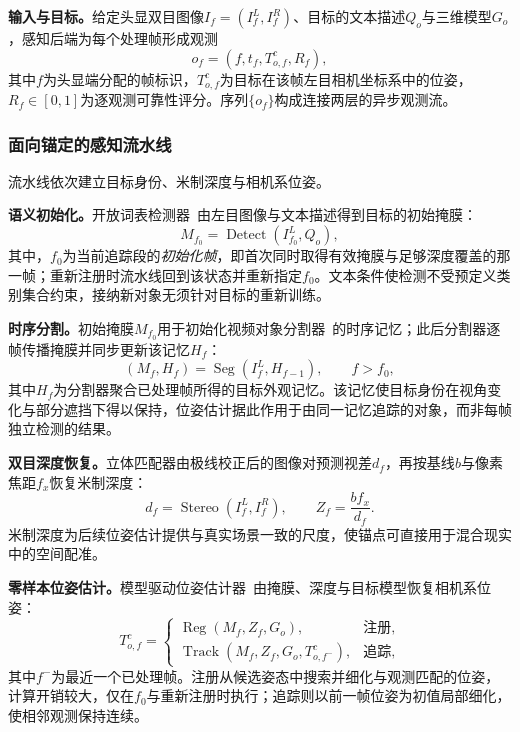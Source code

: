 \documentclass[review]{vgtc}
\begin{document}
\textbf{输入与目标。}给定头显双目图像$I_f = (I_f^L, I_f^R)$、目标的文本描述$Q_o$与三维模型$G_o$，感知后端为每个处理帧形成观测
\begin{equation}
o_f = (f, t_f, T_{o,f}^{c}, R_f),
\label{eq:observation}
\end{equation}
其中$f$为头显端分配的帧标识，$T_{o,f}^{c}$为目标在该帧左目相机坐标系中的位姿，$R_f \in [0,1]$为逐观测可靠性评分。序列$\{o_f\}$构成连接两层的异步观测流。

\subsubsection{面向锚定的感知流水线}

流水线依次建立目标身份、米制深度与相机系位姿。

\textbf{语义初始化。}开放词表检测器~\cite{yoloe2025}由左目图像与文本描述得到目标的初始掩膜：
\begin{equation}
M_{f_0} = \operatorname{Detect}(I_{f_0}^{L}, Q_o),
\label{eq:detect}
\end{equation}
其中，$f_0$为当前追踪段的\emph{初始化帧}，即首次同时取得有效掩膜与足够深度覆盖的那一帧；重新注册时流水线回到该状态并重新指定$f_0$。文本条件使检测不受预定义类别集合约束，接纳新对象无须针对目标的重新训练。

\textbf{时序分割。}初始掩膜$M_{f_0}$用于初始化视频对象分割器~\cite{cutie2024}的时序记忆；此后分割器逐帧传播掩膜并同步更新该记忆$H_f$：
\begin{equation}
(M_f, H_f) = \operatorname{Seg}(I_f^{L}, H_{f-1}), \qquad f > f_0,
\label{eq:seg}
\end{equation}
其中$H_f$为分割器聚合已处理帧所得的目标外观记忆。该记忆使目标身份在视角变化与部分遮挡下得以保持，位姿估计据此作用于由同一记忆追踪的对象，而非每帧独立检测的结果。

\textbf{双目深度恢复。}立体匹配器由极线校正后的图像对预测视差$d_f$，再按基线$b$与像素焦距$f_x$恢复米制深度：
\begin{equation}
d_f = \operatorname{Stereo}(I_f^{L}, I_f^{R}), \qquad Z_f = \frac{b f_x}{d_f}.
\label{eq:depth}
\end{equation}
米制深度为后续位姿估计提供与真实场景一致的尺度，使锚点可直接用于混合现实中的空间配准。

\textbf{零样本位姿估计。}模型驱动位姿估计器~\cite{foundationpose2024}由掩膜、深度与目标模型恢复相机系位姿：
\begin{equation}
T_{o,f}^{c} =
\begin{cases}
\operatorname{Reg}(M_f, Z_f, G_o), & \text{注册}, \\
\operatorname{Track}(M_f, Z_f, G_o, T_{o,f^-}^{c}), & \text{追踪},
\end{cases}
\label{eq:pose}
\end{equation}
其中$f^-$为最近一个已处理帧。注册从候选姿态中搜索并细化与观测匹配的位姿，计算开销较大，仅在$f_0$与重新注册时执行；追踪则以前一帧位姿为初值局部细化，使相邻观测保持连续。
\end{document}
